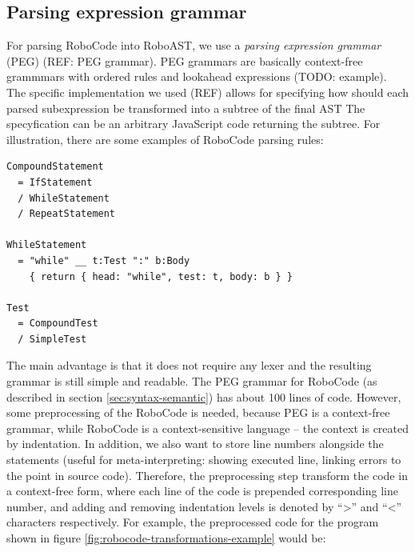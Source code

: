 


\subsection{Parsing expression grammar}

For parsing RoboCode into RoboAST, we use a \emph{parsing expression grammar}
(PEG) (REF: PEG grammar).
PEG grammars are basically context-free grammmars with ordered rules
and lookahead expressions (TODO: example).
The specific implementation we used (REF) allows for specifying how should each
parsed subexpression be transformed into a subtree of the final AST
The specyfication can be an arbitrary JavaScript code returning the subtree.
For illustration, there are some examples of RoboCode parsing rules:

\begin{lstlisting}
CompoundStatement
  = IfStatement
  / WhileStatement
  / RepeatStatement

WhileStatement
  = "while" __ t:Test ":" b:Body
    { return { head: "while", test: t, body: b } }

Test
  = CompoundTest
  / SimpleTest
\end{lstlisting}

The main advantage is that it does not require any lexer and the resulting grammar
is still simple and readable.
The PEG grammar for RoboCode (as described in section \ref{sec:syntax-semantic})
has about 100 lines of code.
However, some preprocessing of the RoboCode is needed, because
PEG is a context-free grammar,
while RoboCode is a context-sensitive language
-- the context is created by indentation.
In addition, we also want to store line numbers alongside the statements
(useful for meta-interpreting:
showing executed line,
linking errors to the point in source code).
Therefore, the preprocessing step transform the code in a context-free form,
where each line of the code is prepended corresponding line number,
and adding and removing indentation levels is denoted by ``>'' and ``<'' characters respectively.
For example, the preprocessed code for the program shown in figure
\ref{fig:robocode-transformations-example} would be:

